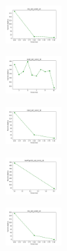 \begin{figure}[H]
    \centering
    \begin{subfigure}
        \centering
        \includegraphics[width=0.234\textwidth]{img/copkm/iris_set_const_10_949004259_cost.png}
    \end{subfigure}
    \hfill
    \begin{subfigure}
        \centering
        \includegraphics[width=0.234\textwidth]{img/copkm/ecoli_set_const_10_949004259_cost.png}
    \end{subfigure}
    \hfill
    \begin{subfigure}
        \centering
        \includegraphics[width=0.234\textwidth]{img/copkm/rand_set_const_10_949004259_cost.png}
    \end{subfigure}
    \hfill
    \begin{subfigure}
        \centering
        \includegraphics[width=0.234\textwidth]{img/copkm/newthyroid_set_const_10_949004259_cost.png}
    \end{subfigure}
    \hfill
    \begin{subfigure}
        \centering
        \includegraphics[width=0.234\textwidth]{img/copkm/iris_set_const_10_589741062_cost.png}
    \end{subfigure}
    \hfill

\end{figure}
